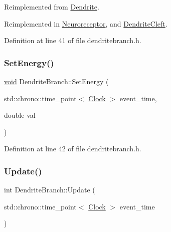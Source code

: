 Reimplemented from \mbox{\hyperlink{class_dendrite_a7529495515de74fff2b9a92b12531057}{Dendrite}}.



Reimplemented in \mbox{\hyperlink{class_neuroreceptor_a0660a316ef44cf723509f720acd16f24}{Neuroreceptor}}, and \mbox{\hyperlink{class_dendrite_cleft_a428b8e5117f381a382e0071b936d42a1}{Dendrite\+Cleft}}.



Definition at line 41 of file dendritebranch.\+h.

\mbox{\label{class_dendrite_branch_a13dd0373022d653448c9067d075586a8}} 
\subsubsection{\texorpdfstring{Set\+Energy()}{SetEnergy()}}
{\footnotesize\ttfamily \mbox{\hyperlink{glad_8h_a950fc91edb4504f62f1c577bf4727c29}{void}} Dendrite\+Branch\+::\+Set\+Energy (\begin{DoxyParamCaption}\item[{std\+::chrono\+::time\+\_\+point$<$ \mbox{\hyperlink{universe_8h_a0ef8d951d1ca5ab3cfaf7ab4c7a6fd80}{Clock}} $>$}]{event\+\_\+time,  }\item[{double}]{val }\end{DoxyParamCaption})\hspace{0.3cm}{\ttfamily [inline]}}



Definition at line 42 of file dendritebranch.\+h.

\mbox{\label{class_dendrite_branch_a8540dfafeb5bd45f782ab31b8231b10f}} 
\subsubsection{\texorpdfstring{Update()}{Update()}}
{\footnotesize\ttfamily int Dendrite\+Branch\+::\+Update (\begin{DoxyParamCaption}\item[{std\+::chrono\+::time\+\_\+point$<$ \mbox{\hyperlink{universe_8h_a0ef8d951d1ca5ab3cfaf7ab4c7a6fd80}{Clock}} $>$}]{event\+\_\+time }\end{DoxyParamCaption})}



